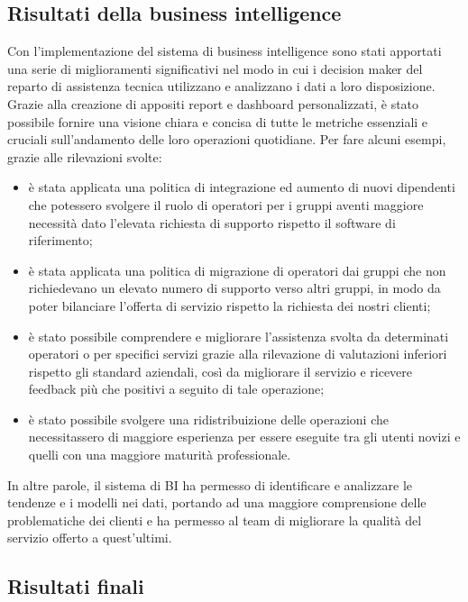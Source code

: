 \subsection{Risultati della business intelligence}

Con l'implementazione del sistema di business intelligence sono stati apportati una serie di miglioramenti significativi nel modo in cui i decision maker del reparto di assistenza tecnica utilizzano e analizzano i dati a loro disposizione. Grazie alla creazione di appositi report e dashboard personalizzati, è stato possibile fornire una visione chiara e concisa di tutte le metriche essenziali e cruciali sull'andamento delle loro operazioni quotidiane. Per fare alcuni esempi, grazie alle rilevazioni svolte:

\begin{itemize}
    \item è stata applicata una politica di integrazione ed aumento di nuovi dipendenti che potessero svolgere il ruolo di operatori per i gruppi aventi maggiore necessità dato l'elevata richiesta di supporto rispetto il software di riferimento;
    \item è stata applicata una politica di migrazione di operatori dai gruppi che non richiedevano un elevato numero di supporto verso altri gruppi, in modo da poter bilanciare l'offerta di servizio rispetto la richiesta dei nostri clienti;
    \item è stato possibile comprendere e migliorare l'assistenza svolta da determinati operatori o per specifici servizi grazie alla rilevazione di valutazioni inferiori rispetto gli standard aziendali, così da migliorare il servizio e ricevere feedback più che positivi a seguito di tale operazione;
    \item è stato possibile svolgere una ridistribuizione delle operazioni che necessitassero di maggiore esperienza per essere eseguite tra gli utenti novizi e quelli con una maggiore maturità professionale.
\end{itemize}

In altre parole, il sistema di BI ha permesso di identificare e analizzare le tendenze e i modelli nei dati, portando ad una maggiore comprensione delle problematiche dei clienti e ha permesso al team di migliorare la qualità del servizio offerto a quest'ultimi.

\subsection{Risultati finali}

